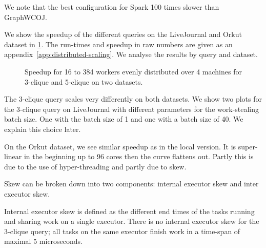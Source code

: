 We note that the best configuration for Spark 100 times slower than GraphWCOJ.

We show the speedup of the different queries on the LiveJournal and Orkut dataset in \cref{fig:distributed-scaling}.
The run-times and speedup in raw numbers are given as an appendix~\cref{app:distributed-scaling}.
We analyse the results by query and dataset.


\begin{figure}
    \subfloat[LiveJournal]{}
    \subfloat[Orkut]{}
    \caption{Speedup for 16 to 384 workers evenly distributed over 4 machines for
    3-clique and 5-clique on two datasets.
    }
    \label{fig:distributed-scaling}
\end{figure}

\begin{table}
    \centering
    \resizebox{\textwidth}{!}{%
    
    }
    \caption{Total skew and percentage of skew in the total run-time for queries on the LiveJournal dataset.
    It is displayed for 3-clique run with a batch size of 1 and a batch size of 40 for the work-stealing
    algorithm.
    }
    \label{table:distributed-skew-livej}
\end{table}

\begin{table}
    \centering
    \resizebox{\textwidth}{!}{%
    
    }
    \caption{Total skew and percentage of skew in the total run-time for queries on the Orkut dataset.
    }

    \label{table:distributed-skew-orkut}
\end{table}

The 3-clique query scales very differently on both datasets.
We show two plots for the 3-clique query on LiveJournal with different parameters for the work-stealing
batch size.
One with the batch size of 1 and one with a batch size of 40.
We explain this choice later.

On the Orkut dataset, we see similar speedup as in the local version.
It is super-linear in the beginning up to 96 cores then the curve flattens out.
Partly this is due to the use of hyper-threading and partly due to skew.

Skew can be broken down into two components: internal executor skew and inter executor skew.

Internal executor skew is defined as the different end times of the tasks running and sharing work on
a single executor.
There is no internal executor skew for the 3-clique query;
all tasks on the same executor finish work in a time-span of maximal 5 microseconds.

